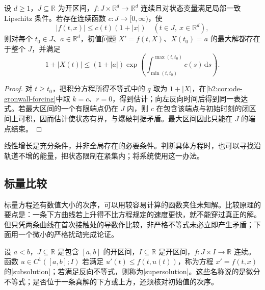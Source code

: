 \begin{corollary}\label{b2:cor:ode-nonautonomous-growth}
设 \(d\geq1\)，\(J\subseteq\mathbb R\) 为开区间，\(f\colon J\times\mathbb R^d\to\mathbb R^d\) 连续且对状态变量满足局部一致 Lipschitz 条件。若存在连续函数 \(c\colon J\to[0,\infty)\)，使
\[
 |f(t,x)|\leq c(t)(1+|x|)\quad(t\in J,\ x\in\mathbb R^d),
\]
则对每个 \(t_0\in J\)、\(a\in\mathbb R^d\)，初值问题 \(X'=f(t,X)\)、\(X(t_0)=a\) 的最大解都存在于整个 \(J\)，并满足
\[
 1+|X(t)|\leq(1+|a|)
 \exp\!\left(\int_{\min(t,t_0)}^{\max(t,t_0)}c(s)\,\mathrm ds\right).
\]
\end{corollary}
\begin{proof}
对 \(t\geq t_0\)，把积分方程所得不等式中的 \(q\) 取为 \(1+|X|\)，在\cref{b2:cor:ode-gronwall-forcing}中取 \(k=c\)、\(r=0\)，得到估计；向左反向时间后得到同一表达式。若最大区间的一个有限端点仍在 \(J\) 内，则 \(c\) 在包含该端点与初始时刻的闭区间上可积，因而估计使状态有界，与爆破判据矛盾。最大区间因此只能在 \(J\) 的端点结束。
\end{proof}

线性增长是充分条件，并非全局存在的必要条件。判断具体方程时，也可以寻找沿轨道不增的能量，把状态限制在紧集内；将系统使用这一办法。

\subsection{标量比较}
\label{b2:subsec:070207}

标量方程还有数值大小的次序，可以用较容易计算的函数夹住未知解。比较原理的要点是：一条下方曲线若上升得不比方程规定的速度更快，就不能穿过真正的解。但只凭两条曲线在首次接触处的导数作比较，非严格不等式未必立即产生矛盾；下面用一个微小的严格扰动完成论证。

\begin{definition}\label{b2:def:ode-sub-supersolution}
设 \(a<b\)，\(J\subseteq\mathbb R\) 是包含 \([a,b]\) 的开区间，\(I\subseteq\mathbb R\) 是开区间，\(f\colon J\times I\to\mathbb R\) 连续。函数 \(u\in C^1([a,b];I)\) 若满足 \(u'(t)\leq f(t,u(t))\)，称为方程 \(x'=f(t,x)\) 的[subsolution]；若满足反向不等式，则称为[supersolution]。这些名称说的是微分不等式；是否位于一条真解的下方或上方，还须核对初始值的次序。
\end{definition}

